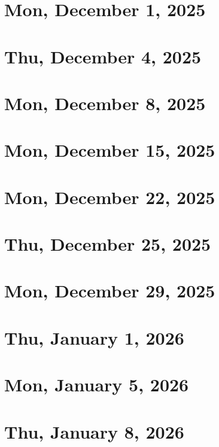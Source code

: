 \documentclass[a4paper]{report}
\begin{document}
\chapter{Mon, December 1, 2025}


\chapter{Thu, December 4, 2025}


\chapter{Mon, December 8, 2025}


\chapter{Mon, December 15, 2025}


\chapter{Mon, December 22, 2025}


\chapter{Thu, December 25, 2025}


\chapter{Mon, December 29, 2025}


\chapter{Thu, January 1, 2026}


\chapter{Mon, January 5, 2026}


\chapter{Thu, January 8, 2026}

\end{document}

